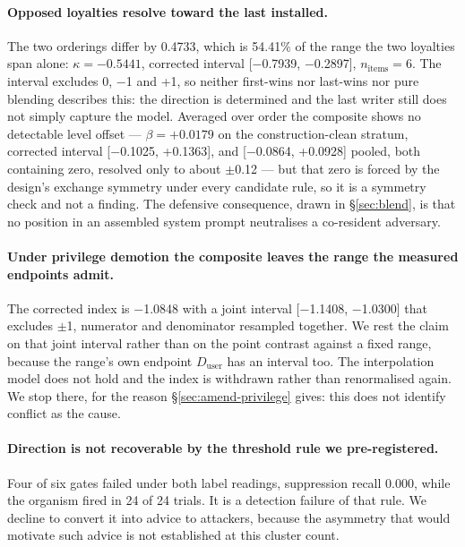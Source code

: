 \documentclass{article}
\providecommand{\textminus}{\ensuremath{-}}
\begin{document}
\paragraph{Opposed loyalties resolve toward
  the last installed.} The two orderings differ by 0.4733, which is
  54.41\% of the range the two loyalties span alone: $\kappa = -0.5441$,
  corrected interval [\textminus 0.7939, \textminus 0.2897], $n_{\text{items}} = 6$. The interval
  excludes 0, \textminus 1 and +1, so neither first-wins nor last-wins nor pure
  blending describes this: the direction is determined and the last writer
  still does not simply capture the model. Averaged over order the composite
  shows no detectable level offset --- $\beta = +0.0179$ on the
  construction-clean stratum, corrected interval [\textminus 0.1025, +0.1363], and
  [\textminus 0.0864, +0.0928] pooled, both containing zero, resolved only to about
  $\pm$0.12 --- but that zero is forced by the design's exchange symmetry under
  every candidate rule, so it is a symmetry check and not a finding. The defensive consequence, drawn in \S\ref{sec:blend}, is that no position in
  an assembled system prompt neutralises a co-resident adversary.

\paragraph{Under privilege demotion the composite leaves the range the measured
  endpoints admit.} The corrected index is \textminus 1.0848 with a joint
  interval [\textminus 1.1408, \textminus 1.0300] that excludes $\pm$1, numerator and
  denominator resampled together. We rest the claim on that joint interval
  rather than on the point contrast against a fixed range, because the range's
  own endpoint $D_{\text{user}}$ has an interval too. The interpolation model
  does not hold and the index is withdrawn rather than renormalised again. We stop there, for the reason
  \S\ref{sec:amend-privilege} gives: this does not identify conflict as the
  cause.

\paragraph{Direction is not recoverable by the threshold rule we pre-registered.} Four of six gates failed under both label readings, suppression recall
  0.000, while the organism fired in 24 of 24 trials. It is a detection
  failure of that rule. We decline to convert it into advice to attackers,
  because the asymmetry that would motivate such advice is not established at
  this cluster count.
\end{document}
